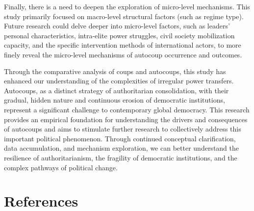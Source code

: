 \documentclass[
  12pt,
]{report}
\begin{document}
Finally, there is a need to deepen the exploration of micro-level
mechanisms. This study primarily focused on macro-level structural
factors (such as regime type). Future research could delve deeper into
micro-level factors, such as leaders' personal characteristics,
intra-elite power struggles, civil society mobilization capacity, and
the specific intervention methods of international actors, to more
finely reveal the micro-level mechanisms of autocoup occurrence and
outcomes.

Through the comparative analysis of coups and autocoups, this study has
enhanced our understanding of the complexities of irregular power
transfers. Autocoups, as a distinct strategy of authoritarian
consolidation, with their gradual, hidden nature and continuous erosion
of democratic institutions, represent a significant challenge to
contemporary global democracy. This research provides an empirical
foundation for understanding the drivers and consequences of autocoups
and aims to stimulate further research to collectively address this
important political phenomenon. Through continued conceptual
clarification, data accumulation, and mechanism exploration, we can
better understand the resilience of authoritarianism, the fragility of
democratic institutions, and the complex pathways of political change.

\chapter*{References}\label{references}
\end{document}

